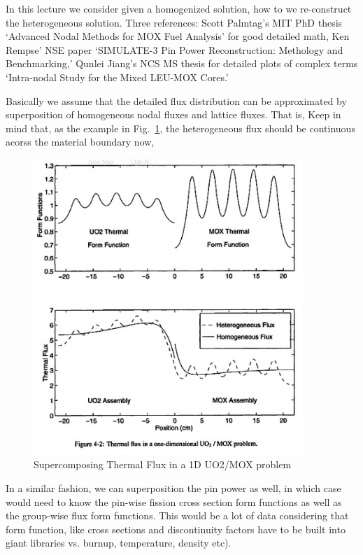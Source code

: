 \documentclass{school-22.211-notes}
\date{May 9, 2012}
\begin{document}
\maketitle

 \label{de-homogenization}
In this lecture we consider given a homogenized solution, how to we re-construct the heterogeneous solution. Three references: Scott Palmtag's MIT PhD thesis `Advanced Nodal Methods for MOX Fuel Analysis' for good detailed math, Ken Rempse' NSE paper `SIMULATE-3 Pin Power Reconstruction: Methology and Benchmarking,' Qunlei Jiang's NCS MS thesis for detailed plots of complex terms `Intra-nodal Study for the Mixed LEU-MOX Cores.' 



Basically we assume that the detailed flux distribution can be approximated by superposition of homogeneous nodal fluxes and lattice fluxes. That is, 
Keep in mind that, as the example in Fig.~\ref{dehom-supercomposing}, the heterogeneous flux should be continuous acorss the material boundary now, 
\begin{figure}[ht]
  \centering
  \includegraphics[width=4in]{images/methd/dehom-supercomposing.png}
  \caption{Supercomposing Thermal Flux in a 1D UO2/MOX problem} \label{dehom-supercomposing}
\end{figure}
In a similar fashion, we can superposition the pin power as well, in which case would need to know the pin-wise fission cross section form functions as well as the group-wise flux form functions. This would be a lot of data considering that form function, like cross sections and discontinuity factors have to be built into giant libraries vs. burnup, temperature, density etc). 
\end{document}
